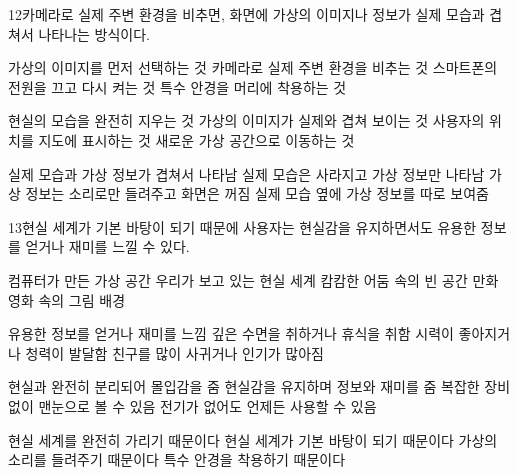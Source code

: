 \documentclass[fs85,seriesRus]{korfarm-base}
\begin{document}
\begin{kfSentenceUnit}{12}{카메라로 실제 주변 환경을 비추면, 화면에 가상의 이미지나 정보가 실제 모습과 겹쳐서 나타나는 방식이다.}
\begin{kfChoices}
\kfChoice 가상의 이미지를 먼저 선택하는 것
\kfChoice 카메라로 실제 주변 환경을 비추는 것
\kfChoice 스마트폰의 전원을 끄고 다시 켜는 것
\kfChoice 특수 안경을 머리에 착용하는 것
\end{kfChoices}
\begin{kfChoices}
\kfChoice 현실의 모습을 완전히 지우는 것
\kfChoice 가상의 이미지가 실제와 겹쳐 보이는 것
\kfChoice 사용자의 위치를 지도에 표시하는 것
\kfChoice 새로운 가상 공간으로 이동하는 것
\end{kfChoices}
\begin{kfChoices}
\kfChoice 실제 모습과 가상 정보가 겹쳐서 나타남
\kfChoice 실제 모습은 사라지고 가상 정보만 나타남
\kfChoice 가상 정보는 소리로만 들려주고 화면은 꺼짐
\kfChoice 실제 모습 옆에 가상 정보를 따로 보여줌
\end{kfChoices}
\end{kfSentenceUnit}

\begin{kfSentenceUnit}{13}{현실 세계가 기본 바탕이 되기 때문에 사용자는 현실감을 유지하면서도 유용한 정보를 얻거나 재미를 느낄 수 있다.}
\begin{kfChoices}
\kfChoice 컴퓨터가 만든 가상 공간
\kfChoice 우리가 보고 있는 현실 세계
\kfChoice 캄캄한 어둠 속의 빈 공간
\kfChoice 만화 영화 속의 그림 배경
\end{kfChoices}
\begin{kfChoices}
\kfChoice 유용한 정보를 얻거나 재미를 느낌
\kfChoice 깊은 수면을 취하거나 휴식을 취함
\kfChoice 시력이 좋아지거나 청력이 발달함
\kfChoice 친구를 많이 사귀거나 인기가 많아짐
\end{kfChoices}
\begin{kfChoices}
\kfChoice 현실과 완전히 분리되어 몰입감을 줌
\kfChoice 현실감을 유지하며 정보와 재미를 줌
\kfChoice 복잡한 장비 없이 맨눈으로 볼 수 있음
\kfChoice 전기가 없어도 언제든 사용할 수 있음
\end{kfChoices}
\begin{kfChoices}
\kfChoice 현실 세계를 완전히 가리기 때문이다
\kfChoice 현실 세계가 기본 바탕이 되기 때문이다
\kfChoice 가상의 소리를 들려주기 때문이다
\kfChoice 특수 안경을 착용하기 때문이다
\end{kfChoices}
\end{kfSentenceUnit}
\end{document}
